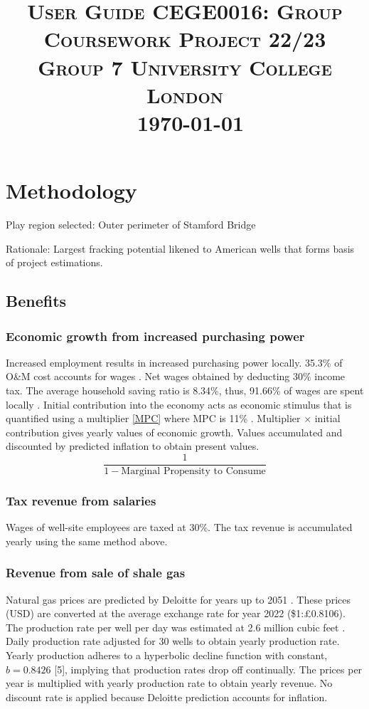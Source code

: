 \documentclass[10pt]{article}
\title{
    \textsc{\huge User Guide }\hfill \textsc{\small CEGE0016: Group Coursework Project 22/23 }\\%
    \textsc{\large Group 7} \hfill \textsc{\small University College London }\\
    \ \hfill \textsc{\small \today }
    \vspace{-3em}
}
\date{}
\author{}
\begin{document}
\maketitle
\section{Methodology}
Play region selected: Outer perimeter of Stamford Bridge

Rationale: Largest fracking potential likened to American wells that forms basis of project estimations.
\subsection{Benefits}
\subsubsection{Economic growth from increased purchasing power}
Increased employment results in increased purchasing power locally. 35.3\% of O\&M cost accounts for wages \cite{001}. Net wages obtained by deducting 30\% income tax. The average household saving ratio is 8.34\%, thus, 91.66\% of wages are spent locally \cite{002}. Initial contribution into the economy acts as economic stimulus that is quantified using a multiplier \eqref{MPC} where MPC is 11\% \cite{003}. Multiplier $\times$ initial contribution gives yearly values of economic growth. Values accumulated and discounted by predicted inflation to obtain present values.
\begin{equation}\label{MPC}
    \frac{1}{1 - \textrm{Marginal Propensity to Consume}}
\end{equation}
\subsubsection{Tax revenue from salaries}
Wages of well-site employees are taxed \cite{004} at 30\%. The tax revenue is accumulated yearly using the same method above.
\subsubsection{Revenue from sale of shale gas}
Natural gas prices are predicted by Deloitte for years up to 2051 \cite{005}. These prices (USD) are converted at the average exchange rate for year 2022 (\$1:\pounds0.8106). The production rate per well per day was estimated at 2.6 million cubic feet \cite{006}. Daily production rate adjusted for 30 wells to obtain yearly production rate. Yearly production adheres to a hyperbolic decline function with constant, $b = 0.8426$ [5], implying that production rates drop off continually. The prices per year is multiplied with yearly production rate to obtain yearly revenue. No discount rate is applied because Deloitte prediction accounts for inflation.
\end{document}
